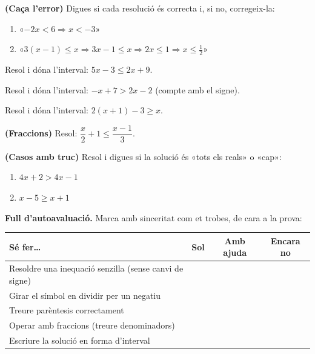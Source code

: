 \begin{exercicis}
\begin{exlist}
  \item \textbf{(Caça l'error)} Digues si cada resolució és correcta i, si no, corregeix-la:
        \begin{enumerate}[label=\alph*), leftmargin=1.6em, topsep=2pt]
          \item «$-2x<6 \Rightarrow x<-3$»
          \item «$3(x-1)\le x \Rightarrow 3x-1\le x \Rightarrow 2x\le 1 \Rightarrow x\le \tfrac{1}{2}$»
        \end{enumerate}
  \item Resol i dóna l'interval: $5x-3\le 2x+9$.
  \item Resol i dóna l'interval: $-x+7>2x-2$ \quad (compte amb el signe).
  \item Resol i dóna l'interval: $2(x+1)-3\ge x$.
  \item \textbf{(Fraccions)} Resol: $\dfrac{x}{2}+1\le \dfrac{x-1}{3}$.
  \item \textbf{(Casos amb truc)} Resol i digues si la solució és «tots els reals» o
        «cap»:
        \begin{enumerate}[label=\alph*), leftmargin=1.6em, topsep=2pt]
          \item $4x+2>4x-1$
          \item $x-5\ge x+1$
        \end{enumerate}
\end{exlist}
\end{exercicis}

\begin{idea}
\textbf{Full d'autoavaluació.} Marca amb sinceritat com et trobes, de cara a la prova:
\begin{center}
\renewcommand{\arraystretch}{1.4}
\begin{tabular}{p{8cm} c c c}
\toprule
\textbf{Sé fer\dots} & \textbf{Sol} & \textbf{Amb ajuda} & \textbf{Encara no} \\
\midrule
Resoldre una inequació senzilla (sense canvi de signe) & & & \\
Girar el símbol en dividir per un negatiu & & & \\
Treure parèntesis correctament & & & \\
Operar amb fraccions (treure denominadors) & & & \\
Escriure la solució en forma d'interval & & & \\
\bottomrule
\end{tabular}
\end{center}
\end{idea}

